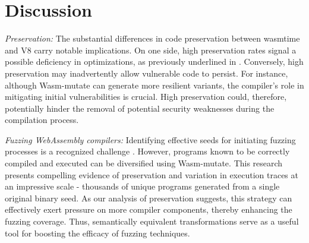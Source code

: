 \documentclass[sigplan,screen]{acmart}
\newcommand*\badge[1]{ \colorbox{red}{\color{white}#1}}
\newcommand{\tool}{Wasm-mutate\xspace}
\newcommand{\Wasm}{WebAssembly\xspace}
\newcommand{\todo}[1]{%
\refstepcounter{todo}
\noindent\textbf{\badge{TODO}} {\color{red}#1}
\addcontentsline{td}{todo}
{\color{red}\thesection.\thetodo\xspace #1}}
\begin{document}















\section{Discussion}
\label{discussion}

\emph{Preservation:} The substantial differences in code preservation between wasmtime and V8 carry notable implications. 
On one side, high preservation rates signal a possible deficiency in optimizations, as previously underlined in \cite{wasmslim}. 
Conversely, high preservation may inadvertently allow vulnerable code to persist.
For instance, although \tool can generate more resilient variants, the compiler's role in mitigating initial vulnerabilities is crucial. 
High preservation could, therefore, potentially hinder the removal of potential security weaknesses during the compilation process.


\emph{Fuzzing \Wasm compilers:}  
Identifying effective seeds for initiating fuzzing processes is a recognized challenge \cite{7958599}. 
However, programs known to be correctly compiled and executed can be diversified using \tool.
This research presents compelling evidence of preservation and variation in execution traces at an impressive scale - thousands of unique programs generated from a single original binary seed. 
As our analysis of preservation suggests, this strategy can effectively exert pressure on more compiler components, thereby enhancing the fuzzing coverage.
Thus, semantically equivalent transformations serve as a useful tool for boosting the efficacy of fuzzing techniques.
\end{document}
